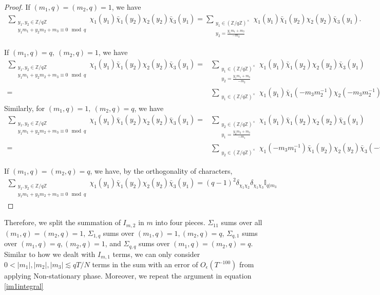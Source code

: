 \begin{proof}
    If $(m_1,q)=(m_2,q)=1$, we have \begin{align*}
        \sum_{\substack{y_1,y_2 \in\mathbb{Z}/q\mathbb{Z} \\ y_1m_1+y_2m_2+m_3\equiv 0 \mod q}}\chi_1(y_1)\bar{\chi}_1(y_2)\chi_2(y_2)\bar{\chi}_3(y_1)=
        \sum_{\substack{y_1\in (\mathbb{Z}/q\mathbb{Z})^\times\\y_2=\frac{y_1m_1+m_3}{-m_2}}}\chi_1(y_1)\bar{\chi}_1(y_2)\chi_2(y_2)\bar{\chi}_3(y_1).
    \end{align*}
    
    If $(m_1,q)=q, \ (m_2,q)=1$, we have \begin{align*}
        \sum_{\substack{y_1,y_2 \in\mathbb{Z}/q\mathbb{Z} \\ y_1m_1+y_2m_2+m_3\equiv 0 \mod q}}\chi_1(y_1)\bar{\chi}_1(y_2)\chi_2(y_2)\bar{\chi}_3(y_1)=&
        \sum_{\substack{y_1\in (\mathbb{Z}/q\mathbb{Z})^\times\\y_2=\frac{y_1m_1+m_3}{-m_2}}}\chi_1(y_1)\bar{\chi}_1(y_2)\chi_2(y_2)\bar{\chi}_3(y_1)\\
        =&\sum_{\substack{y_1\in (\mathbb{Z}/q\mathbb{Z})^\times}}\chi_1(y_1)\bar{\chi}_1(-m_3m_2^{-1})\chi_2(-m_3m_2^{-1})\bar{\chi}_3(y_1).
    \end{align*}
    Similarly, for $(m_1,q)=1, \ (m_2,q)=q$, we have\begin{align*}
        \sum_{\substack{y_1,y_2 \in\mathbb{Z}/q\mathbb{Z} \\ y_1m_1+y_2m_2+m_3\equiv 0 \mod q}}\chi_1(y_1)\bar{\chi}_1(y_2)\chi_2(y_2)\bar{\chi}_3(y_1)=&
        \sum_{\substack{y_2\in (\mathbb{Z}/q\mathbb{Z})^\times\\y_1=\frac{y_2m_2+m_3}{-m_1}}}\chi_1(y_1)\bar{\chi}_1(y_2)\chi_2(y_2)\bar{\chi}_3(y_1)\\
        =&\sum_{\substack{y_2\in (\mathbb{Z}/q\mathbb{Z})^\times}}\chi_1(-m_3m_1^{-1})\bar{\chi}_1(y_2)\chi_2(y_2)\bar{\chi}_3(-m_3m_1^{-1}).
    \end{align*}

    If $(m_1,q)=(m_2,q)=q$, we have, by the orthogonality of characters, \begin{align*}
        \sum_{\substack{y_1,y_2 \in\mathbb{Z}/q\mathbb{Z} \\ y_1m_1+y_2m_2+m_3\equiv 0 \mod q}}\chi_1(y_1)\bar{\chi}_1(y_2)\chi_2(y_2)\bar{\chi}_3(y_1)=(q-1)^2\delta_{\chi_1\chi_2}\delta_{\chi_1\chi_3}\mathbb{I}_{q|m_3}
    \end{align*}

\end{proof}
Therefore, we split the summation of $I_{m,2}$ in $m$ into four pieces. $\Sigma_{11}$ sums over all $(m_1,q)=(m_2,q)=1$, $\Sigma_{1,q}$ sums over $(m_1,q)=1, (m_2,q)=q$, $\Sigma_{q,1}$ sums over $(m_1,q)=q,(m_2,q)=1$, and $\Sigma_{q,q}$ sums over $(m_1,q)=(m_2,q)=q$. Similar to how we dealt with $I_{m,1}$ terms, we can only consider $0<|m_1|,|m_2|,|m_3|\lesssim qT/N$ terms in the sum with an error of $O_\epsilon({T^{-100}})$ from applying Non-stationary phase. Moreover, we repeat the argument in equation \ref{im1integral}







